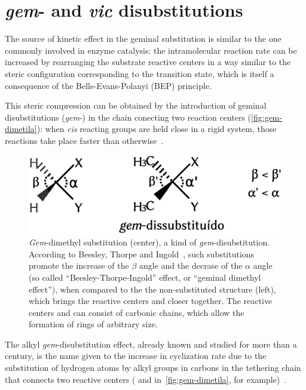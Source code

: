 \chapter{\emph{gem}- and \emph{vic} disubstitutions}%
\label{ch:gem-vic-disubstitions}

The source of kinetic effect in the geminal substitution is similar to the one
commonly involved in enzyme catalysis: the intramolecular reaction rate can be
increased by rearranging the substrate reactive centers in a way similar to the
steric configuration corresponding to the transition state, which is itself a
consequence of the Bells-Evans-Polanyi (BEP) principle.

This steric compression can be obtained by the introduction of geminal
disubstitutions (\emph{gem}-) in the chain conecting two reaction centers
(\autoref{fig:gem-dimetila}):
when \emph{cis} reacting groups are held close in a rigid system,
those reactions take place faster than
otherwise~\cite{Beesley_1915,Allinger_1960,Bruice_1960a,Bruice_1960b,Capon_1964,Bruice_1965,Kirby_1972,Galli_1979,Kirby_1980,Lightstone_1994,Kaneti_2004,Jung_2005,Karaman_2011}.
%
\begin{figure}[hbtp]
    \centering
    \includegraphics[width=.55\textwidth]{figures/gem-dimetil-pt}
    \caption[Beesley-Thorpe-Ingold effect, also known as geminal dimethyl
    effect.]{
        \emph{Gem}-dimethyl substitution (center), a kind of
        \emph{gem}-disubstitution.
        According to Beesley, Thorpe and Ingold~\cite{Beesley_1915,Jung_2005},
        such substitutions promote the increase of the $\beta$ angle and the
        decrase of the $\alpha$ angle (so called ``Beesley-Thorpe-Ingold''
        effect, or ``geminal dimethyl effect''),
        when compared to the the non-substituted structure (left),
        which brings the reactive centers
         and 
        closer together.
        The reactive centers  and  can consist of
        carbonic chains,
        which allow the formation of rings of arbitrary size.}\label{fig:gem-dimetila}
\end{figure}
%
The alkyl \emph{gem}-disubstitution effect,
already known and studied for more than a century,
is the name given to the increase in cyclization rate due
to the substitution of hydrogen atoms by alkyl groups in carbons in the
tethering chain that connects two reactive centers ( and 
in~\autoref{fig:gem-dimetila}, for example)~\cite{Capon_1964,Kirby_1980,Kaneti_2004,Jung_2005}.

